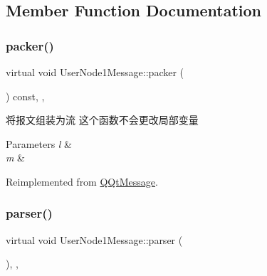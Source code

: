 \subsection{Member Function Documentation}
\mbox{\label{class_user_node1_message_a12d342fefa82c5eb14dd76d34bb4319b}} 
\subsubsection{\texorpdfstring{packer()}{packer()}}
{\footnotesize\ttfamily virtual void User\+Node1\+Message\+::packer (\begin{DoxyParamCaption}\item[{Q\+Byte\+Array \&}]{ }\end{DoxyParamCaption}) const\hspace{0.3cm}{\ttfamily [inline]}, {\ttfamily [override]}, {\ttfamily [virtual]}}



将报文组装为流 这个函数不会更改局部变量 


\begin{DoxyParams}{Parameters}
{\em l} & \\
\hline
{\em m} & \\
\hline
\end{DoxyParams}


Reimplemented from \mbox{\hyperlink{class_q_qt_message_af1885c2c3628495808dca66ee8d72e14}{Q\+Qt\+Message}}.

\mbox{\label{class_user_node1_message_acfe0ac6d034bb3b7bc4553e44c5e41c1}} 
\subsubsection{\texorpdfstring{parser()}{parser()}}
{\footnotesize\ttfamily virtual void User\+Node1\+Message\+::parser (\begin{DoxyParamCaption}\item[{const Q\+Byte\+Array \&}]{ }\end{DoxyParamCaption})\hspace{0.3cm}{\ttfamily [inline]}, {\ttfamily [override]}, {\ttfamily [virtual]}}



